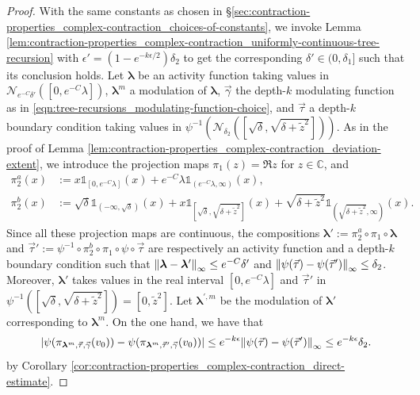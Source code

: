 \documentclass[11pt]{article}
\newcommand{\C}{\mathbb C}
\newcommand{\bl}{\bm{\lambda}}
\newcommand{\tz}{\tilde{z}}
\newcommand{\lsconst}{C}
\newcommand{\indicator}[1]{\mathds{1}_{#1}}
\numberwithin{equation}{section}
\theoremstyle{plain}
\theoremstyle{definition}
\theoremstyle{remark}
\begin{document}
\begin{proof}
With the same constants as chosen in \S\ref{sec:contraction-properties_complex-contraction_choices-of-constants}, we invoke Lemma \ref{lem:contraction-properties_complex-contraction_uniformly-continuous-tree-recursion} with $\epsilon'=(1-e^{-k\epsilon/2})\delta_{2}$ to get the corresponding $\delta'\in(0,\delta_{1}]$ such that its conclusion holds.
Let $\bl$ be an activity function taking values in $\mathcal{N}_{e^{-\lsconst}\delta'}([0,e^{-\lsconst}\lambda])$, $\bl^{m}$ a modulation of $\bl$, $\vec{\gamma}$ the depth-$k$ modulating function as in \eqref{eqn:tree-recursions_modulating-function-choice}, and $\vec{\tau}$ a depth-$k$ boundary condition taking values in $\psi^{-1}(\mathcal{N}_{\delta_{2}}([\sqrt{\delta},\sqrt{\delta+\tz^{2}}]))$.
As in the proof of Lemma \ref{lem:contraction-properties_complex-contraction_deviation-extent}, we introduce the projection maps $\pi_{1}(z)=\Re z$ for $z\in\C$, and
\begin{align}
\pi_{2}^{a}(x){}&:=x\indicator{[0,e^{-\lsconst}\lambda]}(x)+e^{-\lsconst}\lambda\indicator{(e^{-\lsconst}\lambda,\infty)}(x), \\
\pi_{2}^{b}(x){}&:=\sqrt{\delta}\indicator{(-\infty,\sqrt{\delta})}(x)+x\indicator{[\sqrt{\delta},\sqrt{\delta+\tz^{2}}]}(x)+\sqrt{\delta+\tz^{2}}\indicator{(\sqrt{\delta+\tz^{2}},\infty)}(x).
\end{align}
Since all these projection maps are continuous, the compositions $\bl':=\pi_{2}^{a}\circ\pi_{1}\circ\bl$ and $\vec{\tau}':=\psi^{-1}\circ\pi_{2}^{b}\circ\pi_{1}\circ\psi\circ\vec{\tau}$ are respectively an activity function and a depth-$k$ boundary condition such that $\norm{\bl-\bl'}_{\infty}\le e^{-\lsconst}\delta'$ and $\norm{\psi(\vec{\tau})-\psi(\vec{\tau}')}_{\infty}\le\delta_{2}$.
Moreover, $\bl'$ takes values in the real interval $[0,e^{-\lsconst}\lambda]$ and $\vec{\tau}'$ in $\psi^{-1}([\sqrt{\delta},\sqrt{\delta+\tz^{2}}])=[0,\tz^{2}]$.
Let $\bl^{\prime,m}$ be the modulation of $\bl'$ corresponding to $\bl^{m}$.
On the one hand, we have that
\begin{equation}
\label{eqn:contraction-properties_complex-contraction_final-result_change-boundary-condition}
\abs{\psi(\pi_{\bl^{m},\vec{\tau},\vec{\gamma}}(v_{0}))
-\psi(\pi_{\bl^{m},\vec{\tau}',\vec{\gamma}}(v_{0}))}
\le e^{-k \epsilon}
\norm{\psi(\vec{\tau})-\psi(\vec{\tau}')}_{\infty}
\le e^{-k \epsilon}\delta_{2}.
\end{equation}
by Corollary \ref{cor:contraction-properties_complex-contraction_direct-estimate}.

\end{proof}
\end{document}
